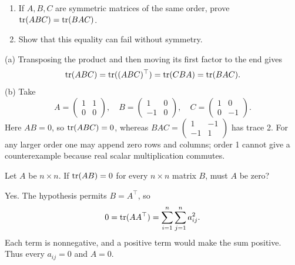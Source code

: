 \begin{problem}\label{ex:02:symmetric-trace}
\begin{enumerate}
\item If $A,B,C$ are symmetric matrices of the same order, prove
$\operatorname{tr}(ABC)=\operatorname{tr}(BAC)$.
\item Show that this equality can fail without symmetry.
\end{enumerate}
\end{problem}
\begin{solution}
(a) Transposing the product and then moving its first factor to the end gives
\[
\operatorname{tr}(ABC)=\operatorname{tr}((ABC)^\top)=\operatorname{tr}(CBA)=\operatorname{tr}(BAC).
\]
(b) Take
\[
A=\begin{pmatrix}1&1\\0&0\end{pmatrix},\quad
B=\begin{pmatrix}1&0\\-1&0\end{pmatrix},\quad
C=\begin{pmatrix}1&0\\0&-1\end{pmatrix}.
\]
Here $AB=0$, so $\operatorname{tr}(ABC)=0$, whereas
$BAC=\begin{pmatrix}1&-1\\-1&1\end{pmatrix}$ has trace 2.
For any larger order one may append zero rows and columns; order 1 cannot give
a counterexample because real scalar multiplication commutes.
\end{solution}

\begin{problem}\label{ex:02:bapat-1-7}
Let $A$ be $n\times n$. If $\operatorname{tr}(AB)=0$ for every $n\times n$ matrix $B$,
must $A$ be zero?
\end{problem}
\begin{solution}
Yes. The hypothesis permits $B=A^\top$, so
\[
0=\operatorname{tr}(AA^\top)=\sum_{i=1}^n\sum_{j=1}^n a_{ij}^2.
\]
Each term is nonnegative, and a positive term would make the sum positive.
Thus every $a_{ij}=0$ and $A=0$.
\end{solution}

